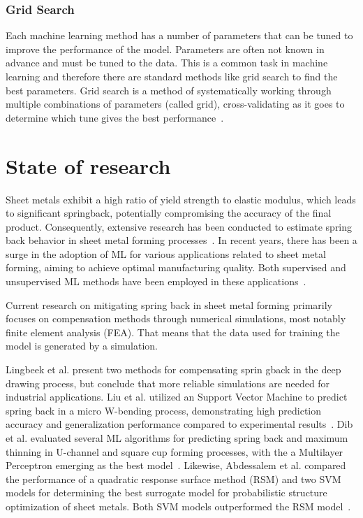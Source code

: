 \subsubsection{Grid Search}\label{subsubsec:grid-search}
Each machine learning method has a number of parameters that can be tuned to improve the
performance of the model.
Parameters are often not known in advance and must be tuned to the data.
This is a common task in machine learning and therefore there are standard methods like
grid search to find the best parameters.
Grid search is a method of systematically working through multiple combinations of
parameters (called grid), cross-validating as it goes to determine which tune gives the best
performance~\cite[p. 260--275]{muller_introductionmachinelearning_2016}.


\section{State of research}\label{sec:state-of-research}
Sheet metals exhibit a high ratio of yield strength to elastic modulus, which leads to significant springback,
potentially compromising the accuracy of the final product. Consequently, extensive research has been conducted to
estimate spring back behavior in sheet metal forming processes~\cite[p. 565]{liu2021deep}.
In recent years, there has been a surge in the adoption of \ac{ML} for various applications related to sheet metal
forming, aiming to achieve optimal manufacturing quality. Both supervised and unsupervised \ac{ML} methods have been
employed in these applications~\cite[p. 2]{cruz_applicationmachinelearning_2021}.

Current research on mitigating spring back in sheet metal forming primarily focuses on compensation methods through
numerical simulations, most notably finite element analysis (FEA)\cite[p. 565]{liu2021deep}.
That means that the data used for training the model is generated by a simulation.

Lingbeek et al.\cite{lingbeek2005development} present two methods for compensating sprin gback in the deep
drawing process, but conclude that more reliable simulations are needed for industrial applications.
Liu et al. utilized an Support Vector Machine to predict spring back in a micro W-bending process, demonstrating high
prediction accuracy and generalization performance compared to experimental
results~\cite[p. 1]{liu_springbackpredictionforming_2019}.
Dib et al. evaluated several \ac{ML} algorithms for predicting spring back and maximum thinning in U-channel and square
cup forming processes, with the a Multilayer Perceptron emerging as the best
model~\cite{dib_singleensembleclassifiers_2020}.
Likewise, Abdessalem et al. compared the performance of a quadratic response surface method (RSM) and two \ac{SVM}
models for determining the best surrogate model for probabilistic structure optimization of sheet metals.
Both \ac{SVM} models outperformed the RSM model~\cite[]{abdessalem2015probabilistic}.

